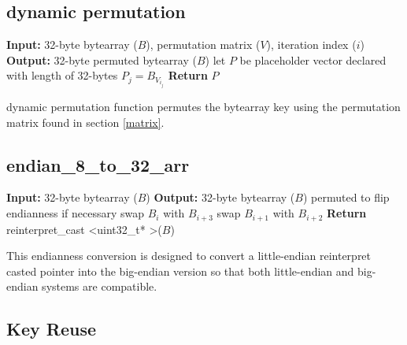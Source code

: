 \documentclass[11pt]{article}
\theoremstyle{definition}
\theoremstyle{remark}
\begin{document}
\subsection{dynamic permutation} \label{dynamic_permutation}

\begin{algorithm}[H] %
\caption{The dynamic\_permutation() in the transformation function}
\begin{algorithmic}[1]  %
\State \textbf{Input:} 32-byte bytearray ($B$), permutation matrix ($V$), iteration index ($i$)
\State \textbf{Output:} 32-byte permuted bytearray ($B$)
\State let $P$ be placeholder vector declared with length of 32-bytes
		\State $P_j = B_{V_{i_j}}$
\EndFor
\State \textbf{Return} $P$
\end{algorithmic}
\end{algorithm}

dynamic permutation function permutes the bytearray key using the permutation matrix found in section \ref{matrix}.

\subsection{endian\_8\_to\_32\_arr} \label{endian}

\begin{algorithm}[H] %
\caption{The endian\_8\_to\_32\_arr() in the transformation function}
\begin{algorithmic}[1]  %
\State \textbf{Input:} 32-byte bytearray ($B$)
\State \textbf{Output:} 32-byte bytearray ($B$) permuted to flip endianness if necessary
		\State swap $B_i$ with $B_{i+3}$
		\State swap $B_{i+1}$ with $B_{i+2}$
	\EndFor
\EndIf
\State \textbf{Return} reinterpret\_cast \textless uint32\_t* \textgreater ($B$)
\end{algorithmic}
\end{algorithm}

This endianness conversion is designed to convert a little-endian reinterpret casted pointer into the big-endian version so that both little-endian and big-endian systems are compatible.

\subsection {Key Reuse}
\end{document}
